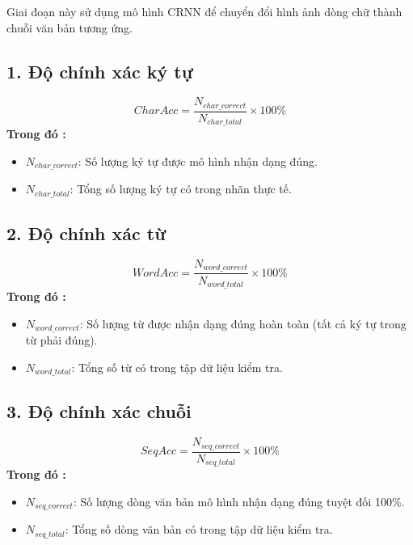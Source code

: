 Giai đoạn này sử dụng mô hình CRNN để chuyển đổi hình ảnh dòng chữ thành chuỗi văn bản tương ứng.

\subsection*{1. Độ chính xác ký tự}
\begin{equation}
CharAcc = \frac{N_{char\_correct}}{N_{char\_total}} \times 100\%
\end{equation}
\textbf{Trong đó :}
\begin{itemize}
    \item $N_{char\_correct}$: Số lượng ký tự được mô hình nhận dạng đúng.
    \item $N_{char\_total}$: Tổng số lượng ký tự có trong nhãn thực tế.
\end{itemize}

\subsection*{2. Độ chính xác từ}
\begin{equation}
WordAcc = \frac{N_{word\_correct}}{N_{word\_total}} \times 100\%
\end{equation}
\textbf{Trong đó :}
\begin{itemize}
    \item $N_{word\_correct}$: Số lượng từ được nhận dạng đúng hoàn toàn (tất cả ký tự trong từ phải đúng).
    \item $N_{word\_total}$: Tổng số từ có trong tập dữ liệu kiểm tra.
\end{itemize}

\subsection*{3. Độ chính xác chuỗi}
\begin{equation}
SeqAcc = \frac{N_{seq\_correct}}{N_{seq\_total}} \times 100\%
\end{equation}
\textbf{Trong đó :}
\begin{itemize}
    \item $N_{seq\_correct}$: Số lượng dòng văn bản mô hình nhận dạng đúng tuyệt đối 100\%.
    \item $N_{seq\_total}$: Tổng số dòng văn bản có trong tập dữ liệu kiểm tra.
\end{itemize}

